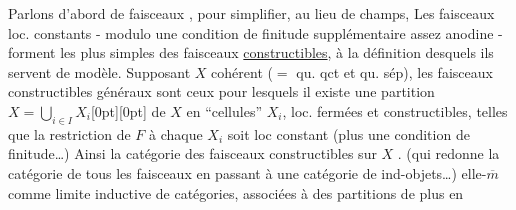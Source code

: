 Parlons d'abord de faisceaux , pour simplifier, au lieu de champs,  Les faisceaux loc. constants - modulo une condition de finitude supplémentaire assez anodine - forment les plus simples des faisceaux \uline{constructibles}, à la définition desquels ils servent de modèle. Supposant $X$ cohérent ($=$ qu. qct et qu. sép), les faisceaux constructibles généraux sont ceux pour lesquels il existe une partition  $X=\bigcup\limits_{i\in I}X_i$\raisebox{-1.7ex}[0pt][0pt]{} de $X$ en ``cellules''  $X_i$, loc. fermées et constructibles, telles que  la restriction de $F$ à chaque $X_i$ soit loc constant  (plus une condition de finitude\ldots) Ainsi la catégorie des faisceaux constructibles sur $X$ . (qui redonne la catégorie de tous les faisceaux en passant à une catégorie de ind-objets\ldots)  elle-$\overline m$ comme limite inductive de catégories, associées à des partitions de plus en
%

